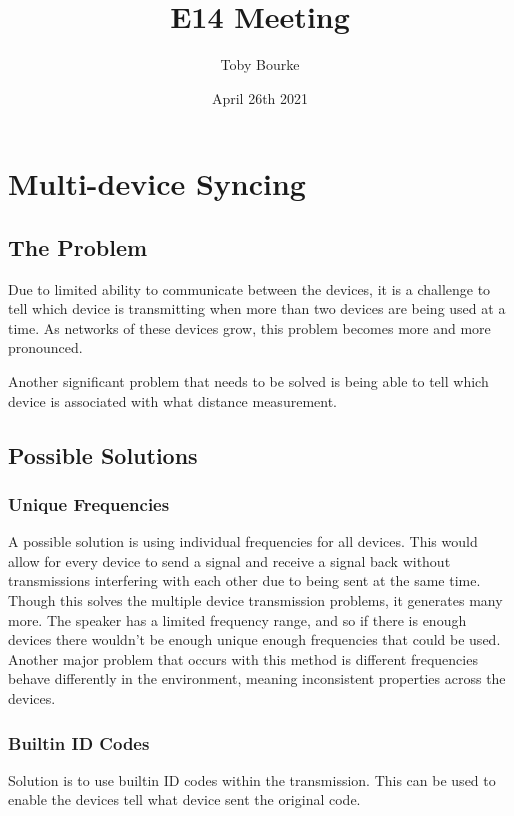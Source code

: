 \documentclass{article}
\title{E14 Meeting}
\author{Toby Bourke}
\date{April 26th 2021}
\begin{document}
\begin{titlepage}
\maketitle
\end{titlepage}

\section{Multi-device Syncing}
\subsection{The Problem}
Due to limited ability to communicate between the devices, it is a challenge to tell which device is transmitting when more than two devices are being used at a time. As networks of these devices grow, this problem becomes more and more pronounced.

Another significant problem that needs to be solved is being able to tell which device is associated with what distance measurement.

\subsection{Possible Solutions}
\subsubsection{Unique Frequencies}
A possible solution is using individual frequencies for all devices. This would allow for every device to send a signal and receive a signal back without transmissions interfering with each other due to being sent at the same time.\\

Though this solves the multiple device transmission problems, it generates many more. The speaker has a limited frequency range, and so if there is enough devices there wouldn't be enough unique enough frequencies that could be used. Another major problem that occurs with this method is different frequencies behave differently in the environment, meaning inconsistent properties across the devices.

\subsubsection{Builtin ID Codes}
Solution is to use builtin ID codes within the transmission. This can be used to enable the devices tell what device sent the original code.\\
\end{document}
